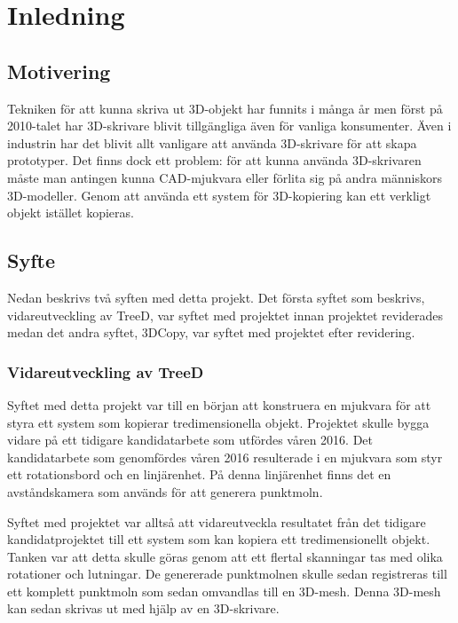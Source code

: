 \chapter{Inledning}
\label{cha:introduction}
 
\section{Motivering}
\label{sec:motivation}



Tekniken för att kunna skriva ut 3D-objekt har funnits i många år men först på 2010-talet har 3D-skrivare blivit tillgängliga även för vanliga konsumenter. Även i industrin har det blivit allt vanligare att använda 3D-skrivare för att skapa prototyper. Det finns dock ett problem: för att kunna använda 3D-skrivaren måste man antingen kunna CAD-mjukvara eller förlita sig på andra människors 3D-modeller. Genom att använda ett system för 3D-kopiering kan ett verkligt objekt istället kopieras.


\section{Syfte}
\label{sec:aim}

Nedan beskrivs två syften med detta projekt. Det första syftet som beskrivs, vidareutveckling av TreeD, var syftet med projektet innan projektet reviderades medan det andra syftet, 3DCopy, var syftet med projektet efter revidering.

\subsection{Vidareutveckling av TreeD}
Syftet med detta projekt var till en början att konstruera en mjukvara för att styra ett system som kopierar tredimensionella objekt. Projektet skulle bygga vidare på ett tidigare kandidatarbete som utfördes våren 2016. Det kandidatarbete som genomfördes våren 2016 resulterade i en mjukvara som styr ett rotationsbord och en linjärenhet. På denna linjärenhet finns det en avståndskamera som används för att generera punktmoln. 

Syftet med projektet var alltså att vidareutveckla resultatet från det tidigare kandidatprojektet till ett system som kan kopiera ett tredimensionellt objekt. Tanken var att detta skulle göras genom att ett flertal skanningar tas med olika rotationer och lutningar. De genererade punktmolnen skulle sedan registreras till ett komplett punktmoln som sedan omvandlas till en 3D-mesh. Denna 3D-mesh kan sedan skrivas ut med hjälp av en 3D-skrivare.

